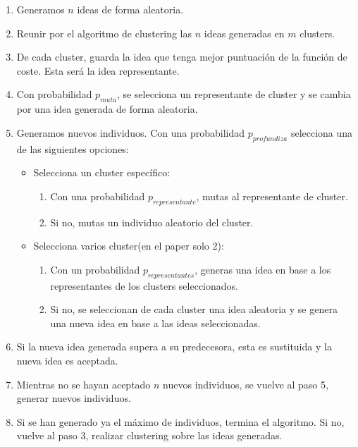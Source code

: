 \begin{enumerate}
	\item Generamos $n$ ideas de forma aleatoria.
	
	\item Reunir por el algoritmo de clustering las $n$ ideas generadas en $m$ clusters.
	
	\item De cada cluster, guarda la idea que tenga mejor puntuación de la función de coste. Esta será la idea representante.
	
	\item Con probabilidad $p_{muta}$, se selecciona un representante de cluster y se cambia por una idea generada de forma aleatoria.
	
	\item Generamos nuevos individuos. Con una probabilidad $p_{profundiza}$ selecciona una de las siguientes opciones:
	
	\begin{itemize}
		\item Selecciona un cluster específico:\\
		\begin{enumerate}
			\item Con una probabilidad $p_{representante}$, mutas al representante de cluster.
			\item Si no, mutas un individuo aleatorio del cluster.
		\end{enumerate}
		
		\item Selecciona varios cluster(en el paper solo 2):\\
		\begin{enumerate}
			\item Con un probabilidad $p_{representantes}$, generas una idea en base a los representantes de los clusters seleccionados.
			\item Si no, se seleccionan de cada cluster una idea aleatoria y se genera una nueva idea en base a las ideas seleccionadas.
		\end{enumerate}
	\end{itemize}
	
	\item Si la nueva idea generada supera a su predecesora, esta es sustituida y la nueva idea es aceptada.
	
	\item Mientras no se hayan aceptado $n$ nuevos individuos, se vuelve al paso 5, generar nuevos individuos.
	
	\item Si se han generado ya el máximo de individuos, termina el algoritmo. Si no, vuelve al paso 3, realizar clustering sobre las ideas generadas.
\end{enumerate}


